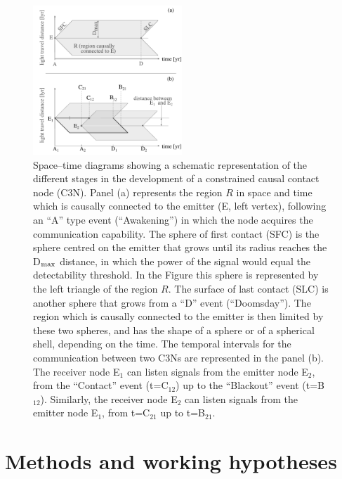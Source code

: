 \documentclass[crop]{CSLB}
\newcommand{\ceti}{C3N}
\newcommand{\cetis}{C3Ns}
\begin{document}
\begin{figure}[!t]
   \centering
   \includegraphics[width=0.5\textwidth]{F_scheme.pdf}
   \caption{
Space--time diagrams showing a schematic representation of the different stages
in the development of a constrained causal contact node (\ceti{}).
%
Panel (a) represents the region $R$ in space and time which is causally
connected to the emitter (E, left vertex), following an ``A'' type
event (``Awakening'') in which the node acquires the communication
capability.
%
The sphere of first contact (SFC) is the sphere centred on the emitter that
grows until its radius reaches the D$_{\rm max}$ distance, in which the
power of the signal would equal the detectability threshold.
%
In the Figure this sphere is represented by the left triangle of the region
$R$.
%
The surface of last contact (SLC) is another sphere that grows from a ``D''
event (``Doomsday'').
%
The region which is causally connected to the emitter is then limited by these
two spheres, and has the shape of a sphere or of a spherical shell,
depending on the time.
%
The temporal intervals for the communication between two \cetis{} are
represented in the panel (b).
%
The receiver node E$_1$ can listen signals from the emitter node E$_2$, from
the ``Contact'' event (t=C$_{12}$) up to the ``Blackout'' event
(t=B$_{12}$).
%
Similarly, the receiver node E$_2$ can listen signals from the emitter
node E$_1$, from t=C$_{21}$ up to t=B$_{21}$. 
%
} \label{F_scheme}
%
\end{figure}



\section{Methods and working hypotheses}\label{S_methods}
\end{document}
